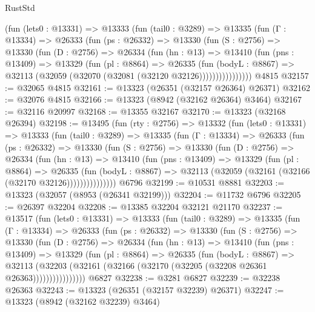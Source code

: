 \begin{lexlean}{RustStd}
\begin{coremodule}
        (fun (lets0 : @13331) =>
        @13333
          (fun (tail0 : @3289) =>
          @13335
            (fun (Γ : @13334) =>
            @26333
              (fun (ps : @26332) =>
              @13330
                (fun (S : @2756) =>
                @13330
                  (fun (D : @2756) =>
                  @26334
                    (fun (hn : @13) =>
                    @13410
                      (fun (pns : @13409) =>
                      @13329
                        (fun (pl : @8864) =>
                        @26335
                          (fun (bodyL : @8867) =>
                          @32113 (@32059 (@32070 (@32081 (@32120 @32126))))))))))))))))
    @4815
@32157 := @32065 @4815
@32161 := @13323 (@26351 (@32157 @26364) @26371)
@32162 := @32076 @4815
@32166 := @13323 (@8942 (@32162 @26364) @3464)
@32167 := @32116 @20997
@32168 := @13355 @32167
@32170 := @13323 (@32168 @26394)
@32198 := @13495
    (fun (rty : @2756) =>
    @13332
      (fun (lets0 : @13331) =>
      @13333
        (fun (tail0 : @3289) =>
        @13335
          (fun (Γ : @13334) =>
          @26333
            (fun (ps : @26332) =>
            @13330
              (fun (S : @2756) =>
              @13330
                (fun (D : @2756) =>
                @26334
                  (fun (hn : @13) =>
                  @13410
                    (fun (pns : @13409) =>
                    @13329
                      (fun (pl : @8864) =>
                      @26335
                        (fun (bodyL : @8867) =>
                        @32113 (@32059 (@32161 (@32166 (@32170 @32126)))))))))))))))
    @6796
@32199 := @10531 @8881
@32203 := @13323 (@32057 (@8953 (@26341 @32199)))
@32204 := @11732 @6796
@32205 := @26397 @32204
@32208 := @13385 @32204 @32121 @21170
@32237 := @13517
    (fun (lets0 : @13331) =>
    @13333
      (fun (tail0 : @3289) =>
      @13335
        (fun (Γ : @13334) =>
        @26333
          (fun (ps : @26332) =>
          @13330
            (fun (S : @2756) =>
            @13330
              (fun (D : @2756) =>
              @26334
                (fun (hn : @13) =>
                @13410
                  (fun (pns : @13409) =>
                  @13329
                    (fun (pl : @8864) =>
                    @26335
                      (fun (bodyL : @8867) =>
                      @32113
                        (@32203
                          (@32161 (@32166 (@32170 (@32205 (@32208 @26361 @26363))))))))))))))))
    @6827
@32238 := @3281 @6827
@32239 := @32238 @26363
@32243 := @13323 (@26351 (@32157 @32239) @26371)
@32247 := @13323 (@8942 (@32162 @32239) @3464)

\end{coremodule}
\end{lexlean}
